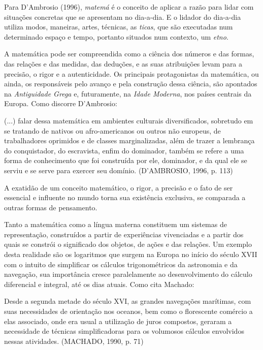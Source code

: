 \documentclass[brasil]{abnt}
\begin{document}
	Para D'Ambrosio (1996), \textit{matemá} é o conceito de aplicar a razão para lidar com situações concretas que se apresentam no dia-a-dia. E o lidador do dia-a-dia utiliza modos, maneiras, 
	artes, técnicas, as \textit{ticas}, que são executadas num determinado espaço e tempo, portanto situados num contexto, um \textit{etno}. 
			
	A matemática pode ser compreendida como a ciência dos números e das formas, das relações e das medidas, das deduções, e as suas atribuições levam para a precisão, o rigor e a autenticidade.
	Os principais protagonistas da matemática, ou ainda, os responsáveis pelo avanço e pela construção dessa ciência, são apontados na \textit{Antiguidade Grega} e, futuramente, na \textit{Idade Moderna}, 
	nos países centrais da Europa. Como discorre D'Ambrosio:
			
		\begin{citacao}(...) falar dessa matemática em ambientes culturais diversificados, sobretudo em se tratando de nativos ou afro-americanos ou outros não europeus, de trabalhadores oprimidos e de classes 
			marginalizadas, além de trazer a lembrança do conquistador, do escravista, enfim do dominador, também se refere a uma forma de conhecimento que foi construída por ele, dominador, e da qual ele se serviu
			e se serve para exercer seu domínio. (D'AMBROSIO, 1996, p. 113)
		\end{citacao}
				  
	A exatidão de um conceito matemático, o rigor, a precisão e o fato de ser essencial e influente no mundo torna sua existência exclusiva, se comparada a outras formas de pensamento. 	
	    
    Tanto a matemática como a língua materna constituem um sistemas de representação, construídos a partir de experiências vivenciadas e a partir dos quais se 
    constrói o significado  dos objetos, de ações e das relações. Um exemplo desta realidade são os logaritmos que surgem na Europa no início do século XVII com 
    o intuito de simplificar os cálculos trigonométricos da astronomia e da navegação, sua importância cresce paralelamente ao desenvolvimento do cálculo 
    diferencial e integral, até os dias atuais. Como cita Machado:
    
		\begin{citacao} Desde a segunda metade do século XVI, as grandes navegações marítimas, com suas necessidades de orientação nos oceanos, bem como o florescente comércio a 
						elas associado, onde era usual a utilização de juros compostos, geraram a necessidade de técnicas simplificadoras para os volumosos cálculos envolvidos nessas 
						atividades. (MACHADO, 1990, p. 71)
		\end{citacao}
    
\end{document}
